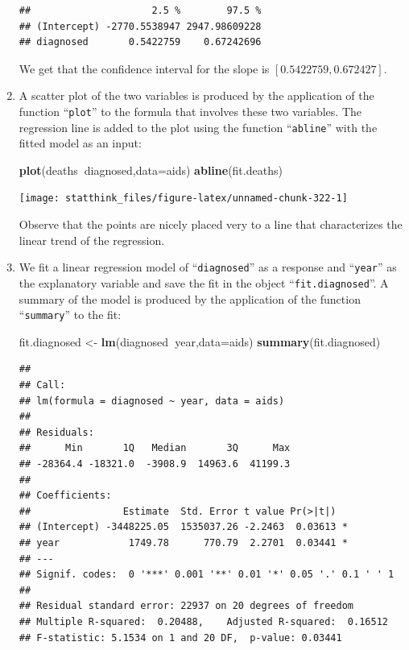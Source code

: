 \documentclass[]{krantz}
\makeatletter
\newenvironment{Shaded}{\begin{snugshade}}{\end{snugshade}}
\newcommand{\DataTypeTok}[1]{\textcolor[rgb]{0.13,0.29,0.53}{#1}}
\newcommand{\KeywordTok}[1]{\textcolor[rgb]{0.13,0.29,0.53}{\textbf{#1}}}
\newcommand{\NormalTok}[1]{#1}
\newcommand{\OperatorTok}[1]{\textcolor[rgb]{0.81,0.36,0.00}{\textbf{#1}}}
\newcommand{\StringTok}[1]{\textcolor[rgb]{0.31,0.60,0.02}{#1}}
\newenvironment{kframe}{%
\medskip{}
\setlength{\fboxsep}{.8em}
 \def\at@end@of@kframe{}%
 \ifinner\ifhmode%
  \def\at@end@of@kframe{\end{minipage}}%
  \begin{minipage}{\columnwidth}%
 \fi\fi%
 \def\FrameCommand##1{\hskip\@totalleftmargin \hskip-\fboxsep
 \colorbox{shadecolor}{##1}\hskip-\fboxsep
     \hskip-\linewidth \hskip-\@totalleftmargin \hskip\columnwidth}%
 \MakeFramed {\advance\hsize-\width
   \@totalleftmargin\z@ \linewidth\hsize
   \@setminipage}}%
 {\par\unskip\endMakeFramed%
 \at@end@of@kframe}
\renewenvironment{Shaded}{\begin{kframe}}{\end{kframe}}
\theoremstyle{definition}
\theoremstyle{definition}
\theoremstyle{definition}
\theoremstyle{remark}
\makeatother
\begin{document}
\begin{enumerate}
\begin{verbatim}
##                     2.5 %        97.5 %
## (Intercept) -2770.5538947 2947.98609228
## diagnosed       0.5422759    0.67242696
\end{verbatim}

  We get that the confidence interval for the slope is \([0.5422759 , 0.672427]\).
\item
  A scatter plot of the two
  variables is produced by the application of the function ``\texttt{plot}'' to the
  formula that involves these two variables. The regression line is added
  to the plot using the function ``\texttt{abline}'' with the fitted model as an
  input:

\begin{Shaded}
\begin{Highlighting}[]
\KeywordTok{plot}\NormalTok{(deaths}\OperatorTok{~}\NormalTok{diagnosed,}\DataTypeTok{data=}\NormalTok{aids)}
\KeywordTok{abline}\NormalTok{(fit.deaths)}
\end{Highlighting}
\end{Shaded}

  \begin{center}\texttt{[image: statthink\_files/figure-latex/unnamed-chunk-322-1]} \end{center}

  Observe that the points are nicely placed very to a line that
  characterizes the linear trend of the regression.
\item
  We fit a linear regression model
  of ``\texttt{diagnosed}'' as a response and ``\texttt{year}'' as the explanatory variable
  and save the fit in the object ``\texttt{fit.diagnosed}''. A summary of the model
  is produced by the application of the function ``\texttt{summary}'' to the fit:

\begin{Shaded}
\begin{Highlighting}[]
\NormalTok{fit.diagnosed <-}\StringTok{ }\KeywordTok{lm}\NormalTok{(diagnosed}\OperatorTok{~}\NormalTok{year,}\DataTypeTok{data=}\NormalTok{aids)}
\KeywordTok{summary}\NormalTok{(fit.diagnosed)}
\end{Highlighting}
\end{Shaded}

\begin{verbatim}
## 
## Call:
## lm(formula = diagnosed ~ year, data = aids)
## 
## Residuals:
##      Min       1Q   Median       3Q      Max 
## -28364.4 -18321.0  -3908.9  14963.6  41199.3 
## 
## Coefficients:
##                Estimate  Std. Error t value Pr(>|t|)  
## (Intercept) -3448225.05  1535037.26 -2.2463  0.03613 *
## year            1749.78      770.79  2.2701  0.03441 *
## ---
## Signif. codes:  0 '***' 0.001 '**' 0.01 '*' 0.05 '.' 0.1 ' ' 1
## 
## Residual standard error: 22937 on 20 degrees of freedom
## Multiple R-squared:  0.20488,    Adjusted R-squared:  0.16512 
## F-statistic: 5.1534 on 1 and 20 DF,  p-value: 0.03441
\end{verbatim}


\end{enumerate}
\end{document}
